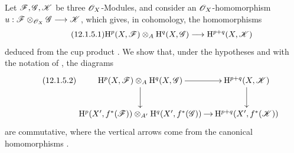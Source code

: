 \begin{env}[12.1.5]
\label{0.12.1.5}
Let $\mathscr{F},\mathscr{G},\mathscr{K}$ be three $\mathscr{O}_X$-Modules, and consider
an $\mathscr{O}_X$-homomorphism $u:\mathscr{F}\otimes_{\mathscr{O}_X}\mathscr{G}\longrightarrow\mathscr{K}$,
which gives, in cohomology, the homomorphisms
\[
\label{0.12.1.5.1}
\tag{12.1.5.1}
  \mathrm{H}^p(X,\mathscr{F})\otimes_A\mathrm{H}^q(X,\mathscr{G})
  \longrightarrow
  \mathrm{H}^{p+q}(X,\mathscr{K})
\]
deduced from the cup product .
We show that, under the hypotheses and with the notation of
, the diagrams
\[
\label{0.12.1.5.2}
\tag{12.1.5.2}
  \xymatrix@C=10pt{
    \HH^p(X,\sh{F})\otimes_A\HH^q(X,\sh{G})
      \ar[r]\ar[d]
      & \HH^{p+q}(X,\sh{K})\ar[d]\\
    \HH^p(X',f^*(\sh{F}))\otimes_{A'}
      \HH^q(X',f^*(\sh{G}))
      \ar[r]
      & \HH^{p+q}(X',f^*(\sh{K}))
  }
\]
are commutative, where the vertical arrows come from the canonical
homomorphisms .


\end{env}
